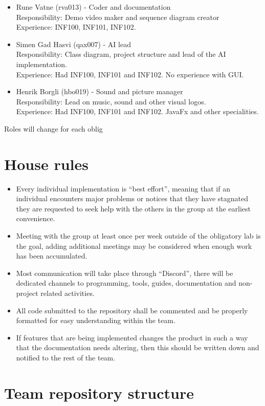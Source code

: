 \documentclass[12pt]{article}%
\begin{document}
\begin{itemize}
\item Rune Vatne  (rva013) - Coder and documentation\\
Responsibility:  Demo video maker and sequence diagram creator \\
	Experience: INF100, INF101, INF102.
\item Simen Gad Hasvi  (qax007) - AI lead\\
Responsibility: Class diagram, project structure and lead of the AI implementation.\\
	Experience: Had INF100, INF101 and INF102. No experience with GUI.
  \item Henrik Borgli (hbo019) - Sound and picture manager\\
  Responsibility: Lead on music, sound and other visual logos.\\
  	Experience: Had INF100, INF101 and INF102. JavaFx and other specialities.
\end{itemize}

Roles will change for each oblig


\section{House rules}


\begin{itemize}
\item Every individual implementation is “best effort”, meaning that if an individual encounters major problems or notices that they have stagnated they are requested to seek help with the others in the group at the earliest convenience.
\item Meeting with the group at least once per week outside of the obligatory lab is the goal, adding additional meetings may be considered when enough work has been accumulated.
\item Most communication will take place through “Discord”, there will be dedicated channels to programming, tools, guides, documentation and non-project related activities.
\item All code submitted to the repository shall be commented and be properly formatted for easy understanding within the team.
\item If features that are being implemented changes the product in such a way that the documentation needs altering, then this should be written down and notified to the rest of the team.
\end{itemize}


\section{Team repository structure}
\end{document}
